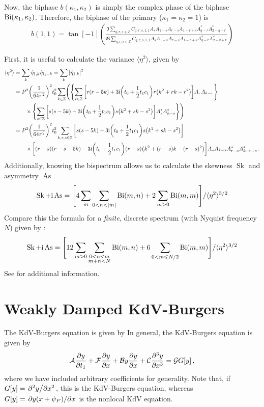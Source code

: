 \documentclass{jfm}
\let\Oldsection\section
\renewcommand{\section}{\FloatBarrier\Oldsection}
\DeclareMathOperator{\Sk}{Sk}
\DeclareMathOperator{\As}{As}
\newcommand{\im}{\mathrm{i}}
\begin{document}
Now, the biphase $b(\kappa_1,\kappa_2)$ is simply the complex phase of
the biphase $\mbox{Bi}(\kappa_1,\kappa_2)$.
Therefore, the biphase of the primary ($\kappa_1 = \kappa_2 = 1$) is
\begin{align*}
  b(1,1) =
  \tan[-1](
  \frac{\Im{\sum_{q,r,s\in\mathbb{Z}}
  C_{q,r,s,1,1}
  A_s A_{1-s} A_{r-s} A_{1-r+s} A^*_{q-r}
  A^*_{2-q+r}}}
  {\Re{\sum_{q,r,s\in\mathbb{Z}}
  C_{q,r,s,1,1}
  A_s A_{1-s} A_{r-s} A_{1-r+s} A^*_{q-r}
  A^*_{2-q+r}}})
\end{align*}

First, it is useful to calculate the variance $\langle \eta^2 \rangle$, given by
\begin{align*}
  \langle \eta^2 \rangle &= \sum_{k} \hat{\eta}_{1,k} \hat{\eta}_{1,-k}
  = \sum_{k} \abs{\hat{\eta}_{1,k}}^2 \\
  &= P^2 \pqty{\frac{1}{64\pi^2}}^2 t_0^2 \sum_{k\in\mathbb{Z}}
  \Biggl( \Biggl\{\sum_{r\in\mathbb{Z}}
  \bqty{r(r-5k) + 3 \im \pqty{t_0 + \frac{1}{2} t_1 c_1} r \pqty{
    k^2 + r k - r^2}} A_r A_{k-r}
  \Biggr\}
  \\ &\qquad\times
  \Biggl\{
  \sum_{s\in\mathbb{Z}}
  \bqty{s(s-5k) - 3 \im \pqty{t_0 + \frac{1}{2} t_1 c_1} s \pqty{
    k^2 + s k - s^2}} A^*_s A^*_{k-s}
  \Biggr\} \Biggl) \\
  &= P^2 \pqty{\frac{1}{64\pi^2}}^2 t_0^2 \sum_{k,r,s\in\mathbb{Z}}
  \bqty{s(s-5k) + 3 \im \pqty{t_0 + \frac{1}{2} t_1 c_1} s \pqty{
    k^2 + s k - s^2}}
  \\ &\qquad\times
  \bqty{(r-s)(r-s-5k) - 3 \im \pqty{t_0 + \frac{1}{2} t_1 c_1} (r-s)
    \pqty{k^2 + (r-s) k - (r-s)^2}}
    A_s A_{k-s} A^*_{r-s} A^*_{k-r+s} \,.
\end{align*}
Additionally, knowing the bispectrum allows us to calculate the skewness
$\Sk$ and asymmetry $\As$
\[
  \Sk + \im \As = \Biggl[4 \sum_m \sum_{0 < n < \abs{m}} \Bi(m,n) + 2
    \sum_{m>0} \Bi(m,m) \Biggr]/\langle \eta^2 \rangle^{3/2}
\]
Compare this the formula for a \emph{finite}, discrete spectrum (with
Nyquist frequency $N$) given by \citet{elgar1987relationships}:
\[
  \Sk + \im \As = \Biggl[12 \sum_{m>0} \sum_{\substack{0 < n < m\\m+n<N}}
    \Bi(m,n) + 6 \sum_{0<m \le N/2} \Bi(m,m) \Biggr]/\langle \eta^2 \rangle^{3/2}
\]
See \citet{elgar1985observations} for additional information.

\appendix

\section{Weakly Damped KdV-Burgers}
The KdV-Burgers equation is given by
In general, the KdV-Burgers equation is given by
\begin{equation}
  \mathcal{A} \pdv{y}{t_1} + \mathcal{F} \pdv{y}{x} + \mathcal{B} y
  \pdv{y}{x} + \mathcal{C} \pdv[3]{y}{x} = \mathcal{G} G[y] \,,
\end{equation}
where we have included arbitrary coefficients for generality.
Note that, if $G[y] = \pdv*[2]{y}{x}$, this is the KdV-Burgers
equation, whereas $G[y] = \pdv*{y(x+\psi_P)}{x}$ is the nonlocal KdV
equation.
\end{document}
